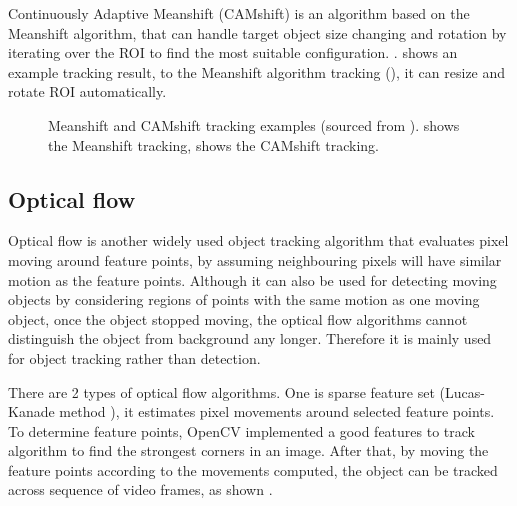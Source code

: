 
Continuously Adaptive Meanshift (CAMshift) \cite{bradski1998computer} is an algorithm based on the Meanshift algorithm, that can handle target object size changing and rotation by iterating over the ROI to find the most suitable configuration. .  shows an example tracking result,  to the Meanshift algorithm tracking (), it can resize and rotate ROI automatically.

\begin{figure}[H]
  \centering
  \caption{Meanshift and CAMshift tracking examples (sourced from \cite{opencv:camshift}).  shows the Meanshift tracking,  shows the CAMshift tracking.}
  \label{bg:ms}
\end{figure}


\subsection {Optical flow}


Optical flow is another widely used object tracking algorithm that evaluates pixel moving around feature points, by assuming neighbouring pixels will have similar motion as the feature points. Although it can also be used for detecting moving objects by considering regions of points with the same motion as one moving object, once the object stopped moving, the optical flow algorithms cannot distinguish the object from background any longer. Therefore it is mainly used for object tracking rather than detection.

There are 2 types of optical flow algorithms. One is sparse feature set (Lucas-Kanade method \cite{bouguet2001pyramidal}), it estimates pixel movements around selected feature points. To determine feature points, OpenCV implemented a good features to track \cite{shi1994good} algorithm to find the strongest corners in an image. After that, by moving the feature points according to the movements computed, the object can be tracked across sequence of video frames, as shown  .

